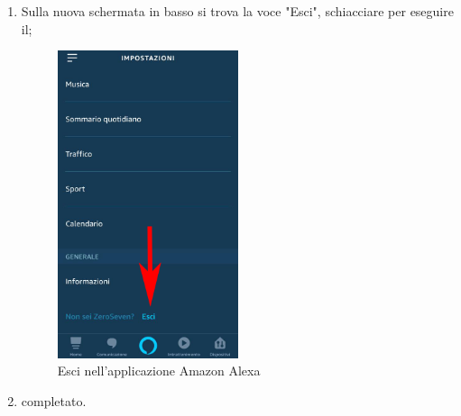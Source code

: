 \begin{enumerate}
\newpage
\item Sulla  nuova schermata in basso si trova la voce "Esci", schiacciare per eseguire il;

\begin{figure}[H]
	\centering
	\includegraphics[width=0.5\textwidth]{images/LogoutAlexa.png}
	\caption{Esci nell'applicazione Amazon Alexa}
\end{figure}

\item {} completato.
\end{enumerate}

 
 








